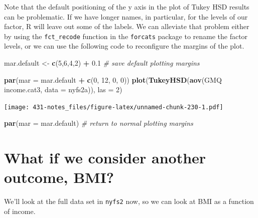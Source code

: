 \documentclass[
]{book}
\newenvironment{Shaded}{\begin{snugshade}}{\end{snugshade}}
\newcommand{\CommentTok}[1]{\textcolor[rgb]{0.56,0.35,0.01}{\textit{#1}}}
\newcommand{\DataTypeTok}[1]{\textcolor[rgb]{0.13,0.29,0.53}{#1}}
\newcommand{\DecValTok}[1]{\textcolor[rgb]{0.00,0.00,0.81}{#1}}
\newcommand{\FloatTok}[1]{\textcolor[rgb]{0.00,0.00,0.81}{#1}}
\newcommand{\KeywordTok}[1]{\textcolor[rgb]{0.13,0.29,0.53}{\textbf{#1}}}
\newcommand{\NormalTok}[1]{#1}
\newcommand{\OperatorTok}[1]{\textcolor[rgb]{0.81,0.36,0.00}{\textbf{#1}}}
\newcommand{\StringTok}[1]{\textcolor[rgb]{0.31,0.60,0.02}{#1}}
\begin{document}
Note that the default positioning of the y axis in the plot of Tukey HSD results can be problematic. If we have longer names, in particular, for the levels of our factor, R will leave out some of the labels. We can alleviate that problem either by using the \texttt{fct\_recode} function in the \texttt{forcats} package to rename the factor levels, or we can use the following code to reconfigure the margins of the plot.

\begin{Shaded}
\begin{Highlighting}[]
\NormalTok{mar.default <-}\StringTok{ }\KeywordTok{c}\NormalTok{(}\DecValTok{5}\NormalTok{,}\DecValTok{6}\NormalTok{,}\DecValTok{4}\NormalTok{,}\DecValTok{2}\NormalTok{) }\OperatorTok{+}\StringTok{ }\FloatTok{0.1} \CommentTok{# save default plotting margins}

\KeywordTok{par}\NormalTok{(}\DataTypeTok{mar =}\NormalTok{ mar.default }\OperatorTok{+}\StringTok{ }\KeywordTok{c}\NormalTok{(}\DecValTok{0}\NormalTok{, }\DecValTok{12}\NormalTok{, }\DecValTok{0}\NormalTok{, }\DecValTok{0}\NormalTok{)) }
\KeywordTok{plot}\NormalTok{(}\KeywordTok{TukeyHSD}\NormalTok{(}\KeywordTok{aov}\NormalTok{(GMQ }\OperatorTok{~}\StringTok{ }\NormalTok{income.cat3, }\DataTypeTok{data =}\NormalTok{ nyfs2a)), }\DataTypeTok{las =} \DecValTok{2}\NormalTok{)}
\end{Highlighting}
\end{Shaded}

\texttt{[image: 431-notes\_files/figure-latex/unnamed-chunk-230-1.pdf]}

\begin{Shaded}
\begin{Highlighting}[]
\KeywordTok{par}\NormalTok{(}\DataTypeTok{mar =}\NormalTok{ mar.default) }\CommentTok{# return to normal plotting margins}
\end{Highlighting}
\end{Shaded}

\hypertarget{what-if-we-consider-another-outcome-bmi}{%
\section{What if we consider another outcome, BMI?}\label{what-if-we-consider-another-outcome-bmi}}

We'll look at the full data set in \texttt{nyfs2} now, so we can look at BMI as a function of income.
\end{document}
